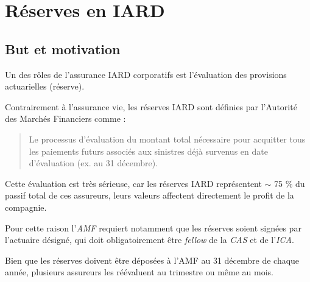 \chapter{Réserves en IARD}
\section{But et motivation}
Un des rôles de l'assurance IARD corporatifs est l'évaluation des provisions actuarielles (réserve).

Contrairement à l'assurance vie, les réserves IARD sont définies par l'Autorité des Marchés Financiers comme :
\begin{quotation}
Le processus d'évaluation du montant total nécessaire pour acquitter tous les paiements futurs associés aux sinistres déjà survenus en date d'évaluation (ex. au 31 décembre).
\end{quotation}

Cette évaluation est très sérieuse, car les réserves IARD représentent $\sim$ 75 \% du passif total de ces assureurs, leurs valeurs affectent directement le profit de la compagnie.

Pour cette raison l'\textit{AMF} requiert notamment que les réserves soient signées par l'actuaire désigné, qui doit obligatoirement être \emph{fellow} de la \emph{CAS} et de l'\emph{ICA}.

Bien que les réserves doivent être déposées à l'AMF au 31 décembre de chaque année, plusieurs assureurs les réévaluent au trimestre ou même au mois.

